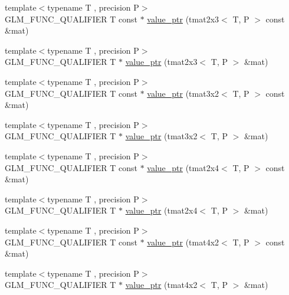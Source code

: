 \begin{DoxyCompactItemize}
{\footnotesize template$<$typename T , precision P$>$ }\\G\+L\+M\+\_\+\+F\+U\+N\+C\+\_\+\+Q\+U\+A\+L\+I\+F\+I\+E\+R T const $\ast$ \hyperlink{group__gtc__type__ptr_ga968f2c8899914ea1c1daaaded8daa6b5}{value\+\_\+ptr} (tmat2x3$<$ T, P $>$ const \&mat)
\item 
{\footnotesize template$<$typename T , precision P$>$ }\\G\+L\+M\+\_\+\+F\+U\+N\+C\+\_\+\+Q\+U\+A\+L\+I\+F\+I\+E\+R T $\ast$ \hyperlink{group__gtc__type__ptr_ga36fb9a17664c8b6848a5d005e4068a2f}{value\+\_\+ptr} (tmat2x3$<$ T, P $>$ \&mat)
\item 
{\footnotesize template$<$typename T , precision P$>$ }\\G\+L\+M\+\_\+\+F\+U\+N\+C\+\_\+\+Q\+U\+A\+L\+I\+F\+I\+E\+R T const $\ast$ \hyperlink{group__gtc__type__ptr_ga398202d6ce304deb7da50badde85ee41}{value\+\_\+ptr} (tmat3x2$<$ T, P $>$ const \&mat)
\item 
{\footnotesize template$<$typename T , precision P$>$ }\\G\+L\+M\+\_\+\+F\+U\+N\+C\+\_\+\+Q\+U\+A\+L\+I\+F\+I\+E\+R T $\ast$ \hyperlink{group__gtc__type__ptr_gad6a737f57febdef255873f6a44d0db0e}{value\+\_\+ptr} (tmat3x2$<$ T, P $>$ \&mat)
\item 
{\footnotesize template$<$typename T , precision P$>$ }\\G\+L\+M\+\_\+\+F\+U\+N\+C\+\_\+\+Q\+U\+A\+L\+I\+F\+I\+E\+R T const $\ast$ \hyperlink{group__gtc__type__ptr_ga2336cd68e72b0d295c8cd33eb1588480}{value\+\_\+ptr} (tmat2x4$<$ T, P $>$ const \&mat)
\item 
{\footnotesize template$<$typename T , precision P$>$ }\\G\+L\+M\+\_\+\+F\+U\+N\+C\+\_\+\+Q\+U\+A\+L\+I\+F\+I\+E\+R T $\ast$ \hyperlink{group__gtc__type__ptr_ga0d745a55255710933effd6391307f681}{value\+\_\+ptr} (tmat2x4$<$ T, P $>$ \&mat)
\item 
{\footnotesize template$<$typename T , precision P$>$ }\\G\+L\+M\+\_\+\+F\+U\+N\+C\+\_\+\+Q\+U\+A\+L\+I\+F\+I\+E\+R T const $\ast$ \hyperlink{group__gtc__type__ptr_ga1de002422f32c6da9d65d3f257f37196}{value\+\_\+ptr} (tmat4x2$<$ T, P $>$ const \&mat)
\item 
{\footnotesize template$<$typename T , precision P$>$ }\\G\+L\+M\+\_\+\+F\+U\+N\+C\+\_\+\+Q\+U\+A\+L\+I\+F\+I\+E\+R T $\ast$ \hyperlink{group__gtc__type__ptr_ga0e62660f9066864568cd74d76d528a6e}{value\+\_\+ptr} (tmat4x2$<$ T, P $>$ \&mat)

\end{DoxyCompactItemize}
